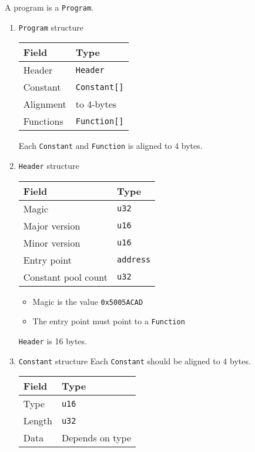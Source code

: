 \documentclass[11pt]{article}
\begin{document}
A program is a \texttt{Program}.

\begin{enumerate}
\item \texttt{Program} structure
\label{sec:orgd4a8252}
\begin{center}
\begin{tabular}{ll}
Field & Type\\
\hline
Header & \texttt{Header}\\
Constant & \texttt{Constant[]}\\
Alignment & to 4-bytes\\
Functions & \texttt{Function[]}\\
\end{tabular}
\end{center}

Each \texttt{Constant} and \texttt{Function} is aligned to 4 bytes.

\item \texttt{Header} structure
\label{sec:org1228260}
\begin{center}
\begin{tabular}{ll}
Field & Type\\
\hline
Magic & \texttt{u32}\\
Major version & \texttt{u16}\\
Minor version & \texttt{u16}\\
Entry point & \texttt{address}\\
Constant pool count & \texttt{u32}\\
\end{tabular}
\end{center}

\begin{itemize}
\item Magic is the value \texttt{0x5005ACAD}
\item The entry point must point to a \texttt{Function}
\end{itemize}

\texttt{Header} is 16 bytes.

\item \texttt{Constant} structure
\label{sec:org608f2fc}
Each \texttt{Constant} should be aligned to 4 bytes.

\begin{center}
\begin{tabular}{ll}
Field & Type\\
\hline
Type & \texttt{u16}\\
Length & \texttt{u32}\\
Data & Depends on type\\
\end{tabular}
\end{center}


\end{enumerate}
\end{document}
